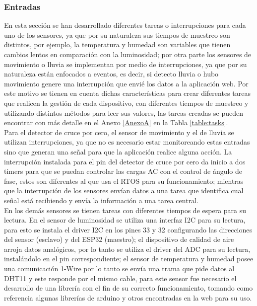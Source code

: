 \subsubsection{Entradas}

En esta sección se han desarrollado diferentes tareas o interrupciones para cada uno de los sensores, ya que por su naturaleza sus tiempos de muestreo son distintos, por ejemplo, la temperatura y humedad son variables que tienen cambios lentos en comparación con la luminosidad; por otra parte los sensores de movimiento o lluvia se implementan por medio de interrupciones, ya que por su naturaleza están enfocados a eventos, es decir, si detecto lluvia o hubo movimiento genere una interrupción que envié los datos a la aplicación web. Por este motivo se tienen en cuenta dichas características para crear diferentes tareas que realicen la gestión de cada dispositivo, con diferentes tiempos de muestreo y utilizando distintos métodos para leer sus valores, las tareas creadas se pueden encontrar con más detalle en el Anexo \ref{AnexoA} en la Tabla \ref{table:tasks}.\\

Para el detector de cruce por cero, el sensor de movimiento y el de lluvia se utilizan interrupciones, ya que no es necesario estar monitoreando estas entradas sino que generan una señal para que la aplicación realice alguna acción. La interrupción instalada para el pin del detector de cruce por cero da inicio a dos timers para que se puedan controlar las cargas AC con el control de ángulo de fase, estos son diferentes al que usa el RTOS para su funcionamiento; mientras que la interrupción de los sensores envían datos a una tarea que identifica cual señal está recibiendo y envía la información a una tarea central.\\

En los demás sensores se tienen tareas con diferentes tiempos de espera para su lectura. En el sensor de luminosidad se utiliza una interfaz I2C para su lectura, para esto se instala el driver I2C en los pines 33 y 32 configurando las direcciones del sensor (esclavo) y del ESP32 (maestro); el dispositivo de calidad de aire arroja datos analógicos, por lo tanto se utiliza el driver del ADC para su lectura, instalándolo en el pin correspondiente; el sensor de temperatura y humedad posee una comunicación 1-Wire por lo tanto se envía una trama que pide datos al DHT11 y este responde por el mismo cable, para este sensor fue necesario el desarrollo de una librería con el fin de su correcto funcionamiento, tomando como referencia algunas librerías de arduino y otros encontradas en la web para su uso.\\

